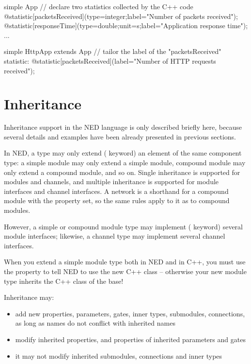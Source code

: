 \begin{ned}
simple App {
    // declare two statistics collected by the C++ code
    @statistic[packetsReceived](type=integer;label="Number of packets received");
    @statistic[responseTime](type=double;unit=s;label="Application response time");
    ...
}

simple HttpApp extends App {
    // tailor the label of the "packetsReceived" statistic:
    @statistic[packetsReceived](label="Number of HTTP requests received");
}
\end{ned}



\section{Inheritance}
\label{sec:ch-ned-lang:inheritance}

Inheritance support in the NED language is only described briefly here,
because several details and examples have been already presented in
previous sections.

In NED, a type may only extend ( keyword) an element of
the same component type: a simple module may only extend a simple module,
compound module may only extend a compound module, and so on. Single
inheritance is supported for modules and channels, and multiple inheritance
is supported for module interfaces and channel interfaces. A network is a
shorthand for a compound module with the  property set, so
the same rules apply to it as to compound modules.

However, a simple or compound module type may implement (
keyword) several module interfaces; likewise, a channel type may implement
several channel interfaces.

\begin{important}
    When you extend a simple module type both in NED and in C++, you must
    use the  property to tell NED to use the new C++ class --
    otherwise your new module type inherits the C++ class of the base!
\end{important}

Inheritance may:
\begin{itemize}
    \item add new properties, parameters, gates, inner types, submodules,
          connections, as long as names do not conflict with inherited names
    \item modify inherited properties, and properties of inherited parameters and
          gates
    \item it may not modify inherited submodules, connections and inner types
\end{itemize}

